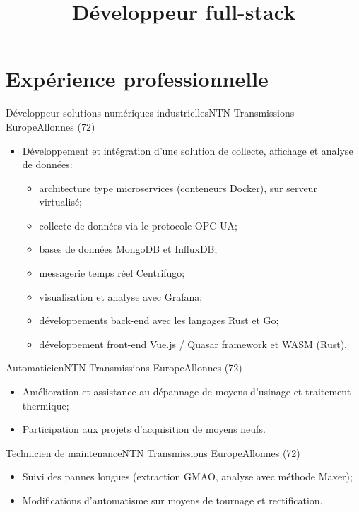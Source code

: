 \documentclass[a4paper,french,10pt]{moderncv}
\title{Développeur full-stack}
\begin{document}
\maketitle{}

\section{Expérience professionnelle}
%
{Développeur solutions numériques industrielles}{NTN Transmissions Europe}{Allonnes (72)}{}{%
  \begin{itemize}
    \item Développement et intégration d'une solution de collecte, affichage
          et analyse de données:
          \begin{itemize}
            \item architecture type microservices (conteneurs Docker), sur serveur virtualisé;
            \item collecte de données via le protocole OPC-UA;
            \item bases de données MongoDB et InfluxDB;
            \item messagerie temps réel Centrifugo;
            \item visualisation et analyse avec Grafana;
            \item développements back-end avec les langages Rust et Go;
            \item développement front-end Vue.js / Quasar framework et WASM (Rust).
          \end{itemize}
  \end{itemize}
}
%
{Automaticien}{NTN Transmissions Europe}{Allonnes (72)}{}{%
  \begin{itemize}
    \item Amélioration et assistance au dépannage de moyens d'usinage
          et traitement thermique;
    \item Participation aux projets d'acquisition de moyens neufs.
  \end{itemize}
}
%
{Technicien de maintenance}{NTN Transmissions Europe}{Allonnes (72)}{}{%
  \begin{itemize}
    \item Suivi des pannes longues (extraction GMAO, analyse avec méthode
          Maxer);
    \item Modifications d'automatisme sur moyens de tournage et rectification.
  \end{itemize}
}
%
\end{document}
